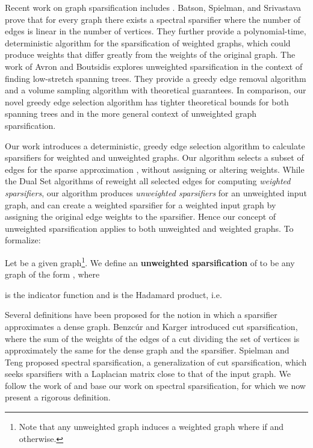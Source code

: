 \documentclass[final,leqno,onefignum,onetabnum]{siamltex1213}
\begin{document}
Recent work on graph sparsification includes \cite{agm,conf/innovations/KapralovP12,ss1,st1,spectsim}.  Batson, Spielman, and Srivastava \cite{ramanujansparse} prove that for every graph there exists a spectral sparsifier where the number of edges is linear in the number of vertices.  They further provide a polynomial-time, deterministic algorithm for the sparsification of weighted graphs, which could produce weights that differ greatly from the weights of the original graph.  The work of Avron and Boutsidis \cite{fasterSub} explores unweighted sparsification in the context of finding low-stretch spanning trees.  They provide a greedy edge removal algorithm and a volume sampling algorithm with theoretical guarantees.  In comparison, our novel greedy edge selection algorithm has tighter theoretical bounds for both spanning trees and in the more general context of unweighted graph sparsification.

Our work introduces a deterministic, greedy edge selection algorithm to calculate sparsifiers for weighted and unweighted graphs.  Our algorithm selects a subset of edges for the sparse approximation , without assigning or altering weights.  While the Dual Set algorithms of \cite{fasterSub, ramanujansparse, nearoptcol} reweight all selected edges for computing \emph{weighted sparsifiers}, our algorithm produces \emph{unweighted sparsifiers} for an unweighted input graph, and can create a weighted sparsifier for a weighted input graph by assigning the original edge weights to the sparsifier.  Hence our concept of unweighted sparsification applies to both unweighted and weighted graphs.  To formalize:

\begin{definition} 
Let  be a given graph\footnote{Note that any unweighted graph  induces a weighted graph  where  if  and
 otherwise.
}. We define an
{\bf unweighted sparsification} of  to be any graph of the form , where 

is the indicator function and
 is the Hadamard product, i.e.

\end{definition}

Several definitions have been proposed for the notion in which a sparsifier approximates a dense graph.  Benzc\'{u}r and Karger \cite{conf/stoc/BenczurK96} introduced cut sparsification, where the sum of the weights of the edges of a cut dividing the set of vertices is approximately the same for the dense graph and the sparsifier.  Spielman and Teng \cite{spectsim} proposed spectral sparsification, a generalization of cut sparsification, which seeks sparsifiers with a Laplacian matrix close to that of the input graph.  We follow the work of \cite{ramanujansparse,spectsim} and base our work on spectral sparsification, for which we now present a rigorous definition.
\end{document}
